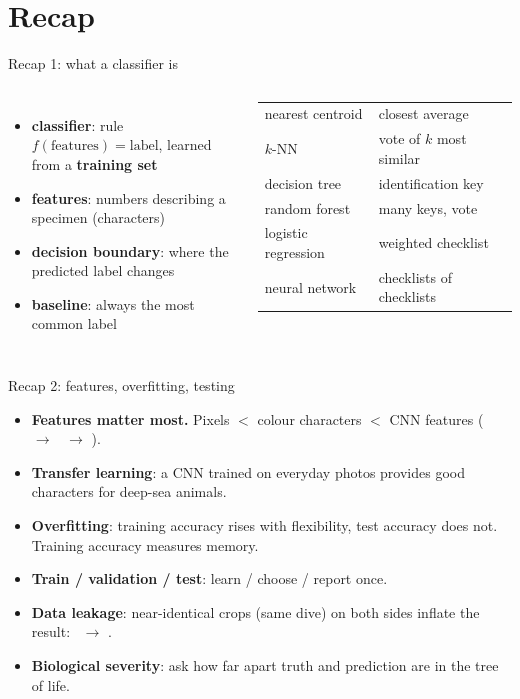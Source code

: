 \documentclass[aspectratio=169,11pt]{beamer}
\begin{document}
\section{Recap}

\begin{frame}{Recap 1: what a classifier is}
\begin{columns}[T]
\begin{itemize}\small
  \item \textbf{classifier}: rule $f(\text{features}) = \text{label}$, learned from a \textbf{training set}
  \item \textbf{features}: numbers describing a specimen (characters)
  \item \textbf{decision boundary}: where the predicted label changes
  \item \textbf{baseline}: always the most common label
\end{itemize}
\small
\begin{tabular}{@{}ll@{}}
\toprule
nearest centroid & closest average \\
$k$-NN & vote of $k$ most similar \\
decision tree & identification key \\
random forest & many keys, vote \\
logistic regression & weighted checklist \\
neural network & checklists of checklists \\
\bottomrule
\end{tabular}
\end{columns}
\end{frame}

\begin{frame}{Recap 2: features, overfitting, testing}
\begin{itemize}
  \item \textbf{Features matter most.} Pixels $<$ colour characters $<$ CNN features (\RefZooBestPixels\ $\rightarrow$ \RefZooBestColour\ $\rightarrow$ \RefZooBest).
  \item \textbf{Transfer learning}: a CNN trained on everyday photos provides good characters for deep-sea animals.
  \item \textbf{Overfitting}: training accuracy rises with flexibility, test accuracy does not. Training accuracy measures memory.
  \item \textbf{Train / validation / test}: learn / choose / report once.
  \item \textbf{Data leakage}: near-identical crops (same dive) on both sides inflate the result: \RefRandomAcc\ $\rightarrow$ \RefDiveAcc.
  \item \textbf{Biological severity}: ask how far apart truth and prediction are in the tree of life.
\end{itemize}
\end{frame}
\end{document}
